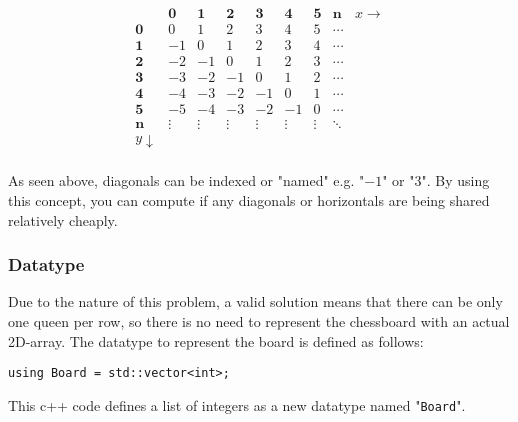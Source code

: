 \documentclass{article}
\begin{document}
\[
    \begin{array}{c|cccccccc}
                   & \mathbf{0} & \mathbf{1} & \mathbf{2} & \mathbf{3} & \mathbf{4} & \mathbf{5} & \mathbf{n} & x \rightarrow \\
        \hline
        \mathbf{0} & 0          & 1          & 2          & 3          & 4          & 5          & \cdots                     \\
        \mathbf{1} & -1         & 0          & 1          & 2          & 3          & 4          & \cdots                     \\
        \mathbf{2} & -2         & -1         & 0          & 1          & 2          & 3          & \cdots                     \\
        \mathbf{3} & -3         & -2         & -1         & 0          & 1          & 2          & \cdots                     \\
        \mathbf{4} & -4         & -3         & -2         & -1         & 0          & 1          & \cdots                     \\
        \mathbf{5} & -5         & -4         & -3         & -2         & -1         & 0          & \cdots                     \\
        \mathbf{n} & \vdots     & \vdots     & \vdots     & \vdots     & \vdots     & \vdots     & \ddots                     \\
        y \downarrow                                                                                                          \\
    \end{array}
\]


As seen above, diagonals can be indexed or "named" e.g. "$-1$" or "$3$".
By using this concept, you can compute if any diagonals or horizontals are being shared relatively cheaply.

\subsubsection{Datatype}
Due to the nature of this problem, a valid solution means that there can be only one queen per row, so there is no need to represent the chessboard with an actual 2D-array.
The datatype to represent the board is defined as follows:

\begin{lstlisting}
using Board = std::vector<int>;
\end{lstlisting}

This c++ code defines a list of integers as a new datatype named "\texttt{Board}".
\end{document}
